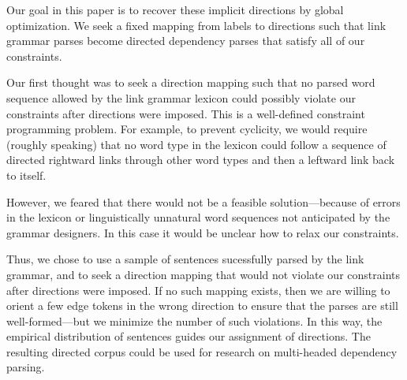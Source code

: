 \documentclass[a4paper,11pt]{article}
\begin{document}
Our goal in this paper is to recover these implicit directions by global optimization.  We seek a fixed mapping from labels to directions such that link grammar parses become directed dependency parses that satisfy all of our constraints.

Our first thought was to seek a direction mapping such that no parsed word sequence allowed by the link grammar lexicon could possibly violate our constraints after directions were imposed.  This is a well-defined constraint programming problem.  For example, to prevent cyclicity, we would require (roughly speaking) that no word type in the lexicon could follow a sequence of directed rightward links through other word types and then a leftward link back to itself.  

However, we feared that there would not be a feasible solution---because of errors in the lexicon or linguistically unnatural word sequences not anticipated by the grammar designers.  In this case it would be unclear how to relax our constraints.

Thus, we chose to use a sample of sentences sucessfully parsed by the link grammar, and to seek a direction mapping that would not violate our constraints after directions were imposed.
If no such mapping exists, then we are willing to orient a few edge tokens in the wrong direction to ensure that the parses are still well-formed---but we minimize the number of such violations.  In this way, the empirical distribution of sentences guides our assignment of directions.  The resulting directed corpus could be used for research on multi-headed dependency parsing.


\end{document}
